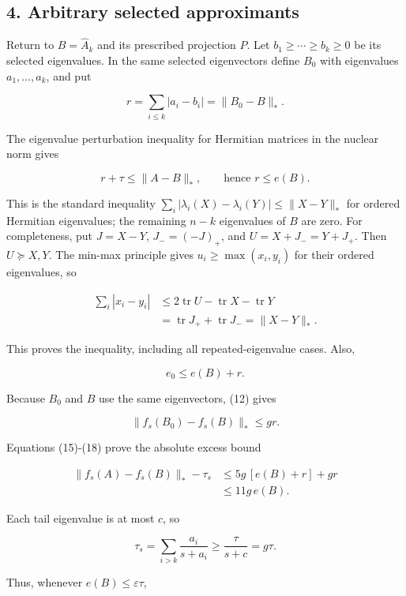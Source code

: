 \documentclass[10pt,a4paper]{article}
\begin{document}
\subsection{4. Arbitrary selected
approximants}\label{arbitrary-selected-approximants}

Return to \(B=\widehat A_k\) and its prescribed projection \(P\). Let
\(b_1\ge\cdots\ge b_k\ge0\) be its selected eigenvalues. In the same
selected eigenvectors define \(B_0\) with eigenvalues
\(a_1,\ldots,a_k\), and put

\[
r=\sum_{i\le k}|a_i-b_i|=\|B_0-B\|_*.
\]

The eigenvalue perturbation inequality for Hermitian matrices in the
nuclear norm gives

\[
r+\tau\le\|A-B\|_*,\qquad\text{hence }r\le e(B).\tag{16}
\]

This is the standard inequality
\(\sum_i|\lambda_i(X)-\lambda_i(Y)|\le\|X-Y\|_*\) for ordered Hermitian
eigenvalues; the remaining \(n-k\) eigenvalues of \(B\) are zero. For
completeness, put \(J=X-Y\), \(J_-=(-J)_+\), and \(U=X+J_-=Y+J_+\). Then
\(U\succeq X,Y\). The min-max principle gives \(u_i\ge\max(x_i,y_i)\)
for their ordered eigenvalues, so

\[
\begin{aligned}
\sum_i|x_i-y_i|
&\le2\operatorname{tr}U-\operatorname{tr}X-\operatorname{tr}Y\\
&=\operatorname{tr}J_++\operatorname{tr}J_-=\|X-Y\|_*.
\end{aligned}
\]

This proves the inequality, including all repeated-eigenvalue cases.
Also,

\[
e_0\le e(B)+r.\tag{17}
\]

Because \(B_0\) and \(B\) use the same eigenvectors, (12) gives

\[
\|f_s(B_0)-f_s(B)\|_*\le gr.\tag{18}
\]


Equations (15)-(18) prove the absolute excess bound

\[
\begin{aligned}
\|f_s(A)-f_s(B)\|_*-\tau_s
&\le5g\,[e(B)+r]+gr\\
&\le11g\,e(B).
\end{aligned}\tag{19}
\]

Each tail eigenvalue is at most \(c\), so

\[
\tau_s=\sum_{i>k}\frac{a_i}{s+a_i}
\ge\frac\tau{s+c}=g\tau.\tag{20}
\]

Thus, whenever \(e(B)\le\varepsilon\tau\),
\end{document}
